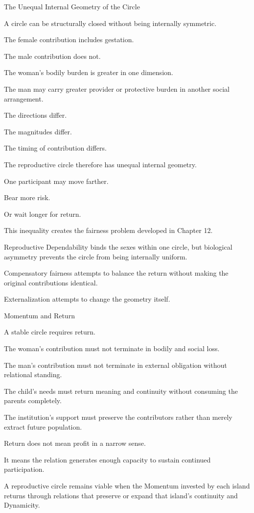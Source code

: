 The Unequal Internal Geometry of the Circle

A circle can be structurally closed without being internally symmetric.

The female contribution includes gestation.

The male contribution does not.

The woman’s bodily burden is greater in one dimension.

The man may carry greater provider or protective burden in another social arrangement.

The directions differ.

The magnitudes differ.

The timing of contribution differs.

The reproductive circle therefore has unequal internal geometry.

One participant may move farther.

Bear more risk.

Or wait longer for return.

This inequality creates the fairness problem developed in Chapter 12.

Reproductive Dependability binds the sexes within one circle, but biological asymmetry prevents the circle from being internally uniform.

Compensatory fairness attempts to balance the return without making the original contributions identical.

Externalization attempts to change the geometry itself.

Momentum and Return

A stable circle requires return.

The woman’s contribution must not terminate in bodily and social loss.

The man’s contribution must not terminate in external obligation without relational standing.

The child’s needs must return meaning and continuity without consuming the parents completely.

The institution’s support must preserve the contributors rather than merely extract future population.

Return does not mean profit in a narrow sense.

It means the relation generates enough capacity to sustain continued participation.

A reproductive circle remains viable when the Momentum invested by each island returns through relations that preserve or expand that island’s continuity and Dynamicity.

